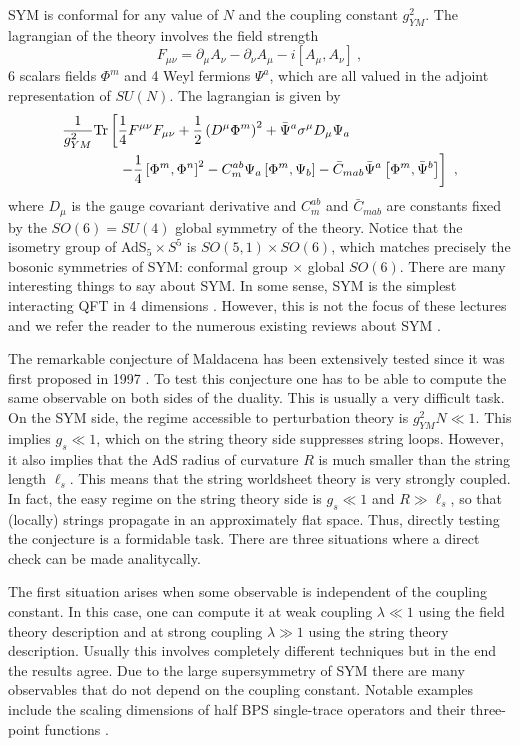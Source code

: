 \documentclass{ws-rv9x6}
\newcommand\be{\begin{equation}}
\newcommand\ee{\end{equation}}
\begin{document}
SYM is conformal for any value of $N$ and the coupling constant $g_{YM}^{2}$.
The lagrangian of the theory involves the field strength 
\be
F_{\mu\nu}=\partial_{\mu}A_{\nu}-\partial_{\nu}A_{\mu}-i\left[A_{\mu},A_{\nu}\right]\ ,
\ee
6 scalars fields $\Phi^{m}$ and 4 Weyl fermions $\Psi^{a}$, which
are all valued in the adjoint representation of $SU(N)$. The lagrangian
is given by
\begin{align}
&\frac{1}{g_{YM}^{2}}{\rm Tr}\left[\frac{1}{4}F^{\mu\nu}F_{\mu\nu}+\frac{1}{2}\left(D^{\mu}\Phi^{m}\right)^{2}+\bar{\Psi}^{a}\sigma^{\mu}D_{\mu}\Psi_{a}\right.\\
&\qquad\qquad\left.-\frac{1}{4}\left[\Phi^{m},\Phi^{n}\right]^{2}-C_{m}^{ab}\Psi_{a}\left[\Phi^{m},\Psi_{b}\right]-\bar{C}_{mab}\bar{\Psi}^{a}\left[\Phi^{m},\bar{\Psi}^{b}\right]\right]\ , \nonumber
\end{align}
where $D_{\mu}$ is the gauge covariant derivative and $C_{m}^{ab}$
and $\bar{C}_{mab}$ are constants fixed by the $SO(6)=SU(4)$ global symmetry
of the theory. Notice that the isometry group of AdS$_{5}\times S^{5}$
is $SO(5,1)\times SO(6)$, which matches precisely the bosonic symmetries
of SYM: conformal group $\times$ global $SO(6)$. There are many
interesting things to say about SYM. In some sense, SYM is the simplest
interacting QFT in 4 dimensions \cite{ArkaniHamed:2008gz}. However, this is not the focus of
these lectures and we refer the reader to the numerous existing reviews
about SYM \cite{hep-th/0201253, arXiv:1012.3982}.

The remarkable conjecture of Maldacena has been extensively tested
since it was first proposed in 1997 \cite{hep-th/9711200}. To test
this conjecture one has to be able to compute the same observable
on both sides of the duality. This is usually a very difficult task.
On the SYM side, the regime accessible to perturbation theory is $g_{YM}^{2}N\ll1$.
This implies $g_{s}\ll1$, which on the string theory side suppresses
string loops. However, it also implies that the AdS radius of curvature
$R$ is much smaller than the string length $\ell_{s}$. This means
that the string worldsheet theory is very strongly coupled. In fact,
the easy regime on the string theory side is $g_{s}\ll1$ and $R\gg\ell_{s}$,
so that (locally) strings propagate in an approximately flat space.
Thus, directly testing the conjecture is a formidable task. There
are three situations where a direct check can be made analitycally. 

The first situation arises when some observable is independent of
the coupling constant. In this case, one can compute it at weak coupling
$\lambda\ll1$ using the field theory description and at strong coupling
$\lambda\gg1$ using the string theory description. Usually this involves
completely different techniques but in the end the results agree.
Due to the large supersymmetry of SYM there are many observables that
do not depend on the coupling constant. Notable examples include the
scaling dimensions of half BPS single-trace operators and their three-point
functions \cite{hep-th/9806074}.
\end{document}
